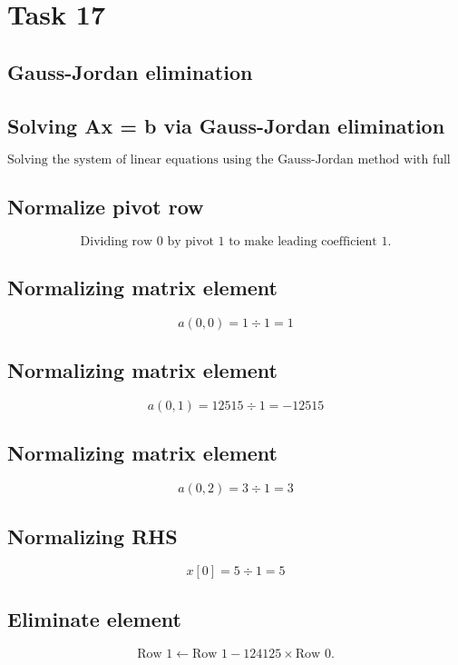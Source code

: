 \documentclass{article}
\begin{document}
\hrulefill
\bigskip

\section*{Task 17}

\subsection*{Gauss-Jordan elimination}
\subsection*{ \vspace{1em} Solving Ax = b via Gauss-Jordan elimination}
\[
\text{Solving the system of linear equations using the Gauss-Jordan method with full row reduction.}
\]
\subsection*{ \vspace{1em} Normalize pivot row}
\[
\text{Dividing row } 0 \text{ by pivot } 1 \text{ to make leading coefficient } 1.
\]
\subsection*{ \vspace{1em} Normalizing matrix element}
\[
a( 0,0 ) = 1 \div 1 = 1
\]
\subsection*{ \vspace{1em} Normalizing matrix element}
\[
a( 0,1 ) = 12515 \div 1 = -12515
\]
\subsection*{ \vspace{1em} Normalizing matrix element}
\[
a( 0,2 ) = 3 \div 1 = 3
\]
\subsection*{ \vspace{1em} Normalizing RHS}
\[
x[0] = 5 \div 1 = 5
\]
\subsection*{ \vspace{1em} Eliminate element}
\[
\text{Row } 1 \leftarrow \text{Row }1 - 124125 \times \text{Row } 0.
\]
\end{document}
